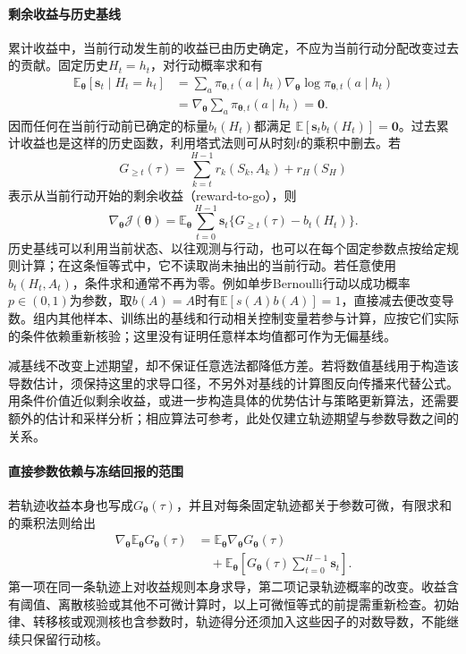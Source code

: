 \paragraph{剩余收益与历史基线}
累计收益中，当前行动发生前的收益已由历史确定，不应为当前行动分配改变过去的贡献。固定历史\(H_t=h_t\)，对行动概率求和有
\begin{equation}
 \begin{aligned}
 \mathbb E_{\bm\theta}[\bm s_t\mid H_t=h_t]
 &=\sum_a\pi_{\bm\theta,t}(a\mid h_t)
       \nabla_{\bm\theta}\log\pi_{\bm\theta,t}(a\mid h_t)\\
 &=\nabla_{\bm\theta}\sum_a\pi_{\bm\theta,t}(a\mid h_t)=\bm0.
 \end{aligned}
 \label{eq:decision-history-score-zero}
\end{equation}
因而任何在当前行动前已确定的标量\(b_t(H_t)\)都满足
\(\mathbb E[\bm s_tb_t(H_t)]=\bm0\)。过去累计收益也是这样的历史函数，利用塔式法则可从时刻\(t\)的乘积中删去。若
\[
 G_{\geq t}(\tau)=\sum_{k=t}^{H-1}r_k(S_k,A_k)+r_H(S_H)
\]
表示从当前行动开始的剩余收益（reward-to-go），则
\begin{equation}
 \nabla_{\bm\theta}\mathcal J(\bm\theta)
 =\mathbb E_{\bm\theta}\sum_{t=0}^{H-1}
   \bm s_t\{G_{\geq t}(\tau)-b_t(H_t)\}.
 \label{eq:decision-return-to-go-baseline}
\end{equation}
历史基线可以利用当前状态、以往观测与行动，也可以在每个固定参数点按给定规则计算；在这条恒等式中，它不读取尚未抽出的当前行动。若任意使用\(b_t(H_t,A_t)\)，条件求和通常不再为零。例如单步Bernoulli行动以成功概率\(p\in(0,1)\)为参数，取\(b(A)=A\)时有\(\mathbb E[s(A)b(A)]=1\)，直接减去便改变导数。组内其他样本、训练出的基线和行动相关控制变量若参与计算，应按它们实际的条件依赖重新核验；这里没有证明任意样本均值都可作为无偏基线。

减基线不改变上述期望，却不保证任意选法都降低方差。若将数值基线用于构造该导数估计，须保持这里的求导口径，不另外对基线的计算图反向传播来代替公式。用条件价值近似剩余收益，或进一步构造具体的优势估计与策略更新算法，还需要额外的估计和采样分析；相应算法可参考，此处仅建立轨迹期望与参数导数之间的关系。

\paragraph{直接参数依赖与冻结回报的范围}
若轨迹收益本身也写成\(G_{\bm\theta}(\tau)\)，并且对每条固定轨迹都关于参数可微，有限求和的乘积法则给出
\begin{equation}
\begin{aligned}
 \nabla_{\bm\theta}\mathbb E_{\bm\theta}G_{\bm\theta}(\tau)
 &=\mathbb E_{\bm\theta}\nabla_{\bm\theta}G_{\bm\theta}(\tau)\\
 &\quad+\mathbb E_{\bm\theta}
 \left[G_{\bm\theta}(\tau)\sum_{t=0}^{H-1}\bm s_t\right].
 \label{eq:decision-parameter-dependent-return-gradient}
\end{aligned}
\end{equation}
第一项在同一条轨迹上对收益规则本身求导，第二项记录轨迹概率的改变。收益含有阈值、离散核验或其他不可微计算时，以上可微恒等式的前提需重新检查。初始律、转移核或观测核也含参数时，轨迹得分还须加入这些因子的对数导数，不能继续只保留行动核。

